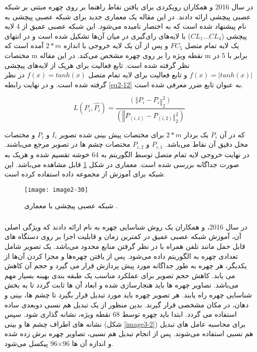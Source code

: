 \noindent
در سال 2016  و همکاران \cite{wu2016facial} رویکردی برای یافتن نقاط راهنما بر روی چهره مبتنی بر شبکه عصبی پیچشی ارائه دادند. در این مقاله یک معماری جدید برای شبکه عصبی پیچشی به نام  پیشنهاد شده است که به اختصار  نامیده می‌شود. این شبکه عصبی عمیق از 4 لایه پیچشی ($CL_1 \dots CL_4$) با لایه‌های رای‌گیری در میان آن‌ها تشکیل شده است و در انتهای یک لایه تمام متصل  $FC_5$ و پس از آن یک لایه خروجی با اندازه $2*m$ آمده است که مختصات m نقطه ویژه را بر روی چهره مشخص می‌کند. در این مقاله m برابر با 5 در نظر گرفته شده است. تابع فعالیت برای هریک از لایه‌های پیچشی $f(x)=|tanh⁡(x)|$ و تابع فعالیت برای لایه تمام متصل $f(x)=tanh⁡(x)$ در نظر گرفته شده است. و در نهایت رابطه \ref{eq2-12} به عنوان تابع ضرر معرفی شده است.

\begin{equation}\label{eq2-12}
L(P_i,\hat{P_i})=\frac{(‖P_i-P ̂_i ‖_2^2)}{(‖P ̂_(i,1)-P ̂_(i,2) ‖_2^2 )}	
\end{equation}

\noindent
که در آن $P_i$ یک بردار $2*m$ برای مختصات پیش بینی شده تصویر $I_i$ و $P_i$ و مختصات محل دقیق آن نقاط می‌باشد. $P_{i,1}$ و $P_{i,2}$ مختصات چشم ها در تصویر مرجع می‌باشند. در نهایت خروجی لایه تمام متصل توسط الگوریتم  به 64 خوشه تقسیم شده و هریک به صورت جداگانه بررسی شده است. معماری  در شکل \ref{image2-30} قابل مشاهده می‌باشد. این شبکه برای آموزش از مجموعه داده  استفاده کرده است.

\begin{figure}[h]
\centering
  \texttt{[image: image2-30]}
  \caption{ شبکه عصبی پیچشی با معماری  \cite{wu2016facial}.}
  \label{image2-30}
\end{figure}

\subsubsection{}
در سال 2016،  و همکاران \cite{amos2016openface} یک روش شناسایی چهره به نام  ارائه دادند که ویژگی اصلی آن، آموزش شبکه عصبی عمیق در کمترین زمان و قابلیت اجرا بر روی دستگاه های قابل حمل مانند تلفن همراه با در نظر گرفتن منابع محدود می‌باشد. یک تصویر شامل تعدادی چهره به الگوریتم داده می‌شود. پس از یافتن چهره‌ها و مجزا کردن  آن‌ها از یکدیگر، هر چهره به طور جداگانه مورد پیش پردازش  قرار می گیرد و حجم آن کاهش می یابد. کاهش حجم تصویر برای عملکرد مناسب یک طبقه بندی بهینه بسیار مهم می‌باشد. تصاویر چهره ها باید هنجارسازی شده و ابعاد آن ها ثابت گردد تا به بخش شناسایی چهره راه یابند. هر تصویر چهره باید مورد تبدیل قرار بگیرد تا چشم ها، بینی و دهان، در مکان مشخصی قرار گیرند. بدین منظور از یک تبدیل هم نسبی  دوبعدی ساده استفاده می گردد. ابتدا باید چهره توسط 68 نقطه ویژه، نشانه گذاری شود. سپس نشانه های اطراف چشم ها و بینی (شکل \ref{image3-2}) برای محاسبه عامل های تبدیل هم نسبی استفاده می‌شوند. پس از انجام تبدیل هم نسبی، تصاویر چهره برش زده شده و اندازه آن ها 96×96 پیکسل می‌شود.

